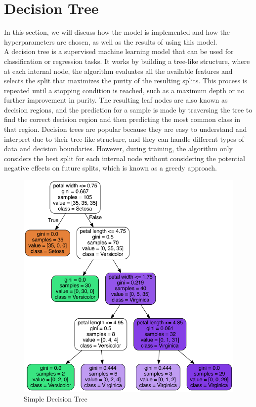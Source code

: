 \section{Decision Tree}
In this section, we will discuss how the  model is implemented and how the hyperparameters are chosen, as well as the results of using this model.\\

A decision tree is a supervised machine learning model that can be used for classification or regression tasks.
It works by building a tree-like structure, where at each internal node, the algorithm evaluates all the available features and selects the split that maximizes the purity of the resulting splits.
This process is repeated until a stopping condition is reached, such as a maximum depth or no further improvement in purity.
The resulting leaf nodes are also known as decision regions, and the prediction for a sample is made by traversing the tree to find the correct decision region and then predicting the most common class in that region.
Decision trees are popular because they are easy to understand and interpret due to their tree-like structure, and they can handle different types of data and decision boundaries.
However, during training, the algorithm only considers the best split for each internal node without considering the potential negative effects on future splits, which is known as a greedy approach.

\begin{figure}[H]
    \centering
    \includegraphics[scale=0.25]{figures_for_report/example_decision_tree}
    \captionsetup{justification=centering,margin=2cm}
    \caption{Simple Decision Tree}
\end{figure}


